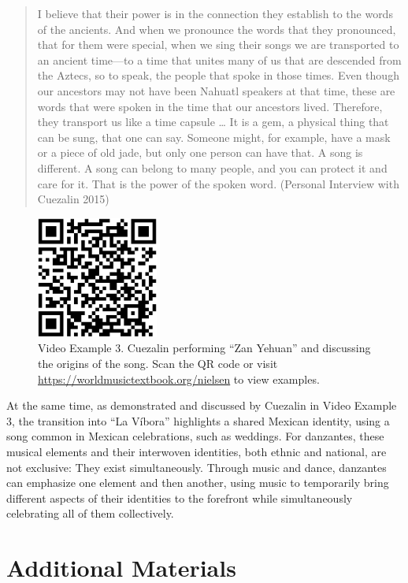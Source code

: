 \documentclass[twoside]{article}
\providecommand{\wmturl}{\href{https://worldmusictextbook.org/nielsen}{https://worldmusictextbook.org/nielsen}}
\providecommand{\wmturlcaption}{
  Scan the QR code or visit \wmturl{} to view examples.
}
\begin{document}
\begin{quote}
I believe that their power is in the connection they establish to the
words of the ancients. And when we pronounce the words that they
pronounced, that for them were special, when we sing their songs we are
transported to an ancient time---to a time that unites many of us that
are descended from the Aztecs, so to speak, the people that spoke in
those times. Even though our ancestors may not have been Nahuatl
speakers at that time, these are words that were spoken in the time that
our ancestors lived. Therefore, they transport us like a time capsule
\ldots{} It is a gem, a physical thing that can be sung, that one can
say. Someone might, for example, have a mask or a piece of old jade, but
only one person can have that. A song is different. A song can belong to
many people, and you can protect it and care for it. That is the power
of the spoken word. (Personal Interview with Cuezalin 2015)
\end{quote}

\begin{figure}
  \centering
  \includegraphics[height=4cm]{nielsen-video-3.png}
  \caption*{Video Example 3. Cuezalin performing ``Zan Yehuan'' and discussing the origins of the song. \wmturlcaption}
\end{figure}

At the same time, as demonstrated and discussed by Cuezalin in Video
Example 3, the transition into ``La Víbora'' highlights a shared Mexican
identity, using a song common in Mexican celebrations, such as weddings.
For danzantes, these musical elements and their interwoven identities,
both ethnic and national, are not exclusive: They exist simultaneously.
Through music and dance, danzantes can emphasize one element and then
another, using music to temporarily bring different aspects of their
identities to the forefront while simultaneously celebrating all of them
collectively.

\hypertarget{additional-materials}{%
\section*{Additional Materials}\label{additional-materials}}
\end{document}
